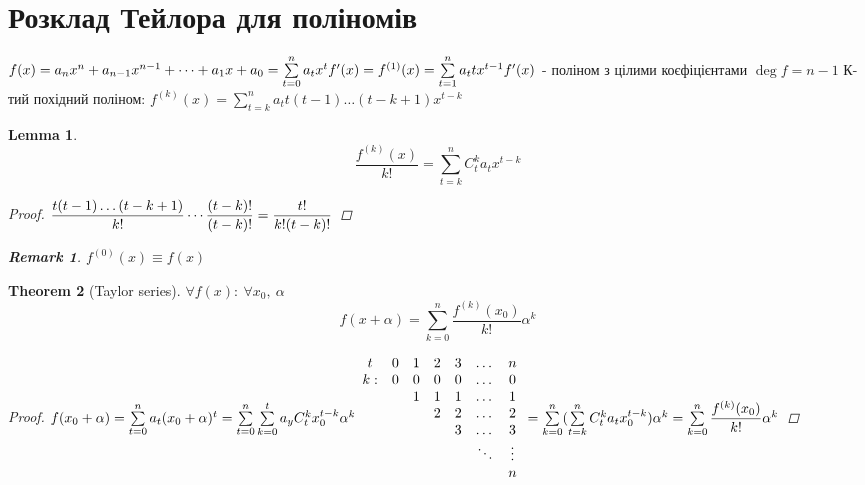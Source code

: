 \documentclass[a4paper,12pt, centered]{bookest}
\newtheorem{theorem}{Theorem}[section]
\newtheorem{lemma}[theorem]{Lemma}
\newtheorem*{remark*}{\emph{Remark}}
\begin{document}
\section{Розклад Тейлора для поліномів}
$f(x)=a_nx^n+a_{n-1}x^{n-1}+\dots+a_1x+a_0=\sum\limits_{t=0}^na_tx^t\\f'(x)=f^{(1)}(x)=\sum\limits_{t=1}^na_ttx^{t-1}\\f'(x)$ - поліном з цілими коєфіцієнтами $\deg f=n-1$
К-тий похідний поліном:
$f^{(k)}(x)=\sum\limits_{t=k}^na_tt(t-1)\dots(t-k+1)x^{t-k}$ 
\begin{lemma}
	$$\dfrac{f^{(k)}(x)}{k!}=\sum\limits_{t=k}^nC_t^ka_tx^{t-k}$$
	\begin{proof}
		$\\\dfrac{t(t-1)\dots(t-k+1)}{k!}\cdots\dfrac{(t-k)!}{(t-k)!}=\dfrac{t!}{k!(t-k)!}$
	\end{proof}
	\begin{remark*}
		$f^{(0)}(x)\equiv f(x)$
	\end{remark*}
\end{lemma}
\begin{theorem}[Taylor series]$\forall f(x):\>\forall x_0,\>\alpha$
	$$f(x+\alpha)=\sum\limits_{k=0}^{n}\dfrac{f^{(k)}(x_
	0)}{k!}\alpha^k$$
	\begin{proof}
		$\\f(x_0+\alpha)=\sum\limits_{t=0}^{n}a_t(x_0+\alpha)^t=\sum\limits_{t=0}^{n}\sum\limits_{k=0}^{t}a_yC_t^kx_0^{t-k}\alpha^k\\\begin{array}{ccccccc}
		t & 0 & 1 & 2 & 3 & \dots & n\\
		k: & 0 & 0 & 0 & 0 & \dots & 0\\
		 &  & 1 & 1 & 1 & \dots & 1\\
		  &  &  & 2 & 2 & \dots & 2\\
		   &  &  &  & 3 & \dots & 3\\
		   &  &  &  &  & \ddots & \vdots\\
		      &  &  &  &  & & n
			
		\end{array}\\=\sum\limits_{k=0}^{n}(\sum\limits_{t=k}^{n}C_t^ka_tx_0^{t-k})\alpha^k=\sum\limits_{k=0}^{n}\dfrac{f^{(k)}(x_0)}{k!}\alpha^k$
	\end{proof}
\end{theorem}
\end{document}
